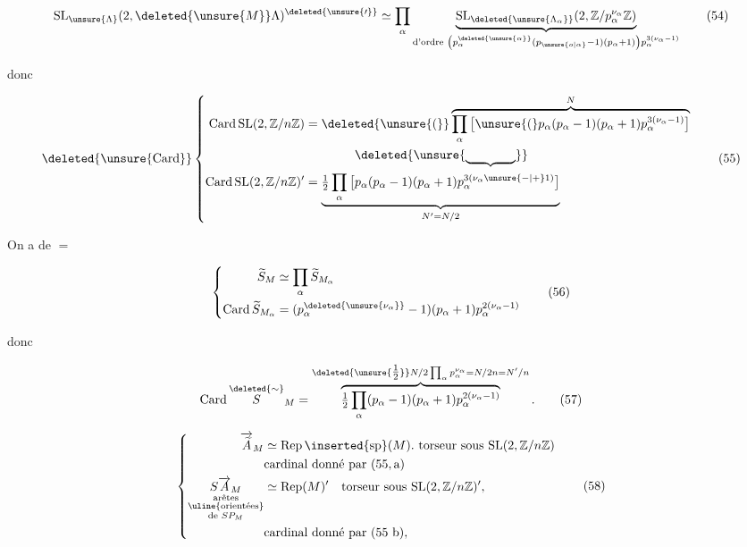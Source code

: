 
\[
\mathrm{SL}_{\unsure{\Lambda}}(2,\deleted{\unsure{M}}\Lambda)^{\deleted{\unsure{\prime}}}
\simeq\prod_\alpha\underbrace{\mathrm{SL}_{\deleted{\unsure{\Lambda_\alpha}}}(2,\mathbb{Z}/p_\alpha^{\nu_\alpha}\mathbb{Z})}_{\text{d'ordre }\left(p_\alpha^{\deleted{\unsure{\alpha}}}(p_{\unsure{o|\alpha}}-1)(p_\alpha+1)\right)p_\alpha^{3(\nu_\alpha-1)}}\tag*{(54)}
\]

donc

\[
\deleted{\unsure{\operatorname{Card}}}
\left\{\begin{aligned}
\operatorname{Card}\mathrm{SL}(2,\mathbb{Z}/n\mathbb{Z})&=\deleted{\unsure{(}}\overbrace{\prod_{\alpha}\big[\unsure{(}p_\alpha(p_\alpha-1)(p_\alpha+1)p_\alpha^{3(\nu_\alpha-1)}\big]}^N\\
&\hspace{4em}\deleted{\unsure{\underbrace{\hspace{4em}}}}\\
\operatorname{Card}\mathrm{SL}(2,\mathbb{Z}/n\mathbb{Z})'&=\underbrace{\tfrac12\prod_{\alpha}\big[p_\alpha(p_\alpha-1)(p_\alpha+1)p_\alpha^{3(\nu_\alpha\unsure{-|+}1)}\big]}_{N'=N/2}
\end{aligned}\right.\tag*{(55)}
\]

 On a de $=$

\[
\left\{\begin{aligned}
\widetilde S_M&\simeq\prod_\alpha\widetilde S_{M_\alpha}\\
\operatorname{Card}\widetilde S_{M_\alpha}&=(p_\alpha^{\deleted{\unsure{\nu_\alpha}}}-1)(p_\alpha+1)p_\alpha^{2(\nu_\alpha-1)}
\end{aligned}\right.\tag*{(56)}
\]

donc

\[
\operatorname{Card}\overset{\deleted{\sim}}{S}_M=
\overbrace{\tfrac12\prod_\alpha(p_\alpha-1)(p_\alpha+1)p_\alpha^{2(\nu_\alpha-1)}}^{\deleted{\unsure{\tfrac12}}N/2\prod_\alpha p_\alpha^{\nu_\alpha}=N/2n=N'/n}.\tag*{(57)}
\]

\[
\left\{\begin{aligned}
\overrightarrow{\widetilde A}_M&\simeq\operatorname{Rep}\inserted{\mathrm{sp}}(M).\ \text{torseur sous }\mathrm{SL}(2,\mathbb{Z}/n\mathbb{Z})\\
&\text{cardinal donné par }(55,\mathrm{a})\\
\underset{\substack{\text{arêtes}\\\text{\uline{orientées}}\\\text{de }SP_M}}{S\overrightarrow A_M}&\simeq\operatorname{Rep}(M)'\quad\text{torseur sous }\mathrm{SL}(2,\mathbb{Z}/n\mathbb{Z})',\\
&\text{cardinal donné par }(55\ \mathrm{b}),
\end{aligned}\right.\tag*{(58)}
\]

